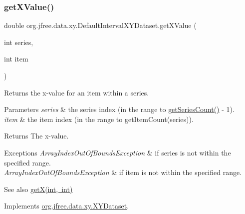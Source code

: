 \subsubsection{\texorpdfstring{get\+X\+Value()}{getXValue()}}
{\footnotesize\ttfamily double org.\+jfree.\+data.\+xy.\+Default\+Interval\+X\+Y\+Dataset.\+get\+X\+Value (\begin{DoxyParamCaption}\item[{int}]{series,  }\item[{int}]{item }\end{DoxyParamCaption})}

Returns the x-\/value for an item within a series.


\begin{DoxyParams}{Parameters}
{\em series} & the series index (in the range {} to {\ttfamily \mbox{\hyperlink{classorg_1_1jfree_1_1data_1_1xy_1_1_default_interval_x_y_dataset_a11470bfa9b540c971123d4282c0f5a8a}{get\+Series\+Count()}} -\/ 1}). \\
\hline
{\em item} & the item index (in the range {} to {\ttfamily get\+Item\+Count(series)}).\\
\hline
\end{DoxyParams}
\begin{DoxyReturn}{Returns}
The x-\/value.
\end{DoxyReturn}

\begin{DoxyExceptions}{Exceptions}
{\em Array\+Index\+Out\+Of\+Bounds\+Exception} & if {\ttfamily series} is not within the specified range. \\
\hline
{\em Array\+Index\+Out\+Of\+Bounds\+Exception} & if {\ttfamily item} is not within the specified range.\\
\hline
\end{DoxyExceptions}
\begin{DoxySeeAlso}{See also}
\mbox{\hyperlink{classorg_1_1jfree_1_1data_1_1xy_1_1_default_interval_x_y_dataset_a73bb4e27acf510ab125c2a2c1fb4020a}{get\+X(int, int)}} 
\end{DoxySeeAlso}


Implements \mbox{\hyperlink{interfaceorg_1_1jfree_1_1data_1_1xy_1_1_x_y_dataset_a65bd212539d8f7dfb3d3d36b5f42e083}{org.\+jfree.\+data.\+xy.\+X\+Y\+Dataset}}.

\mbox{\label{classorg_1_1jfree_1_1data_1_1xy_1_1_default_interval_x_y_dataset_a5085de7f01a34d6599e275e3151c0e1c}} 
